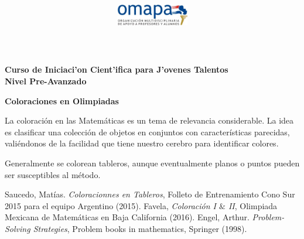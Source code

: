 \documentclass{article}
\title{
\begin{center}
\includegraphics[width=120px, height=40px]{omapa.jpg}\\
\end{center}
}
\date{}
\begin{document}
\maketitle
\begin{center}
\bfseries{Curso de Iniciaci'on Cient'ifica para J'ovenes Talentos\\
Nivel Pre-Avanzado \\
}
\end{center}

\begin{center}
	{\bfseries {\Large Coloraciones en Olimpiadas}}
\end{center}

La coloraci\'on en las Matem\'aticas es un tema de relevancia considerable. La idea es clasificar una colecci\'on de objetos en conjuntos con caracter\'isticas parecidas, vali\'endonos de la facilidad que tiene nuestro cerebro para identificar colores. 

Generalmente se colorean tableros, aunque eventualmente planos o puntos pueden ser susceptibles al m\'etodo.




%
%
%
%

\begin{thebibliography}{99}



 Saucedo, Mat\'ias. \emph{Coloracionnes en Tableros}, Folleto de Entrenamiento Cono Sur 2015 para el equipo Argentino (2015).
 Favela, \emph{Coloraci\'on I $\&$ II}, Olimpiada Mexicana de Matem\'aticas en Baja California (2016).
 Engel, Arthur. \emph{Problem-Solving Strategies}, Problem books in mathematics, Springer (1998).

\end{thebibliography}
\end{document}

